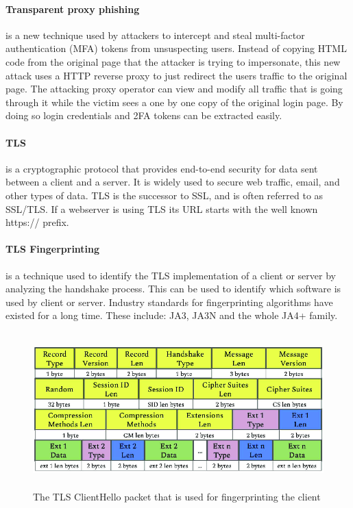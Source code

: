 \documentclass[12pt]{scrbook}
\begin{document}
\paragraph{Transparent proxy phishing} is a new technique used by attackers to intercept and steal
multi-factor authentication (MFA) tokens from unsuspecting users. Instead of
copying HTML code from the original page that the attacker is trying to
impersonate, this new attack uses a HTTP reverse proxy to just redirect the
users traffic to the original page. The attacking proxy operator can view and
modify all traffic that is going through it while the victim sees a one by one
copy of the original login page. By doing so login credentials and 2FA tokens
can be extracted easily.

\paragraph{TLS} is a cryptographic protocol that provides
end-to-end security for data sent between a client and a server. It is widely
used to secure web traffic, email, and other types of data. TLS is the successor
to SSL, and is often referred to as SSL/TLS. If a webserver is using TLS its URL
starts with the well known https:// prefix.

\paragraph{TLS Fingerprinting} is a technique used to identify the TLS implementation of a client or server by analyzing the handshake process. This can be used to identify which software is
used by client or server. Industry standards for fingerprinting algorithms have
existed for a long time. These include: JA3, JA3N and the whole JA4+ family.
\begin{figure}[!h] \centering
  \includegraphics[height=6cm]{./images/client_hello_packet.png}
  \caption{The TLS ClientHello packet that is used for fingerprinting the client}
\end{figure}
\end{document}
